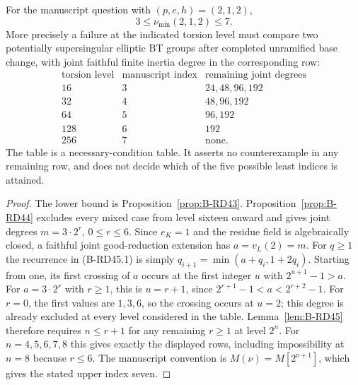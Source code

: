 \begin{theorem}
\label{thm:B-RD45}
For the manuscript question with $(p,e,h)=(2,1,2)$,
\[
                         3\le\nu_{\min}(2,1,2)\le7.
 \tag{B-RD45.5}
\]
More precisely a failure at the indicated torsion level must
compare two potentially supersingular elliptic BT groups after
completed unramified base change, with joint faithful finite
inertia degree in the corresponding row:
\[
\begin{array}{c|c|c}
\text{torsion level}&\text{manuscript index}&\text{remaining joint degrees}\\
\hline
16&3&24,48,96,192\\
32&4&48,96,192\\
64&5&96,192\\
128&6&192\\
256&7&\text{none}.
\end{array}
 \tag{B-RD45.6}
\]
The table is a necessary-condition table. It asserts no
counterexample in any remaining row, and does not decide
which of the five possible least indices is attained.
\end{theorem}
\begin{proof}
The lower bound is Proposition~\ref{prop:B-RD43}.
Proposition~\ref{prop:B-RD44} excludes every mixed case from
level sixteen onward and gives joint degrees $m=3\cdot2^r$,
$0\le r\le6$. Since $e_K=1$ and the residue field is algebraically
closed, a faithful joint good-reduction extension has
$a=v_L(2)=m$.
For $q\ge1$ the recurrence in (B-RD45.1) is simply
$q_{i+1}=\min(a+q_i,1+2q_i)$.
Starting from one, its first crossing of $a$ occurs at the
first integer $u$ with $2^{u+1}-1>a$.
For $a=3\cdot2^r$ with $r\ge1$, this is $u=r+1$, since
$2^{r+1}-1<a<2^{r+2}-1$. For $r=0$, the first values are
$1,3,6$, so the crossing occurs at $u=2$; this degree is already
excluded at every level considered in the table.
Lemma~\ref{lem:B-RD45} therefore requires $n\le r+1$ for
any remaining $r\ge1$ at level $2^n$.
For $n=4,5,6,7,8$ this gives exactly the displayed rows,
including impossibility at $n=8$ because $r\le6$.
The manuscript convention is $M(\nu)=M[2^{\nu+1}]$, which
gives the stated upper index seven.
\end{proof}

